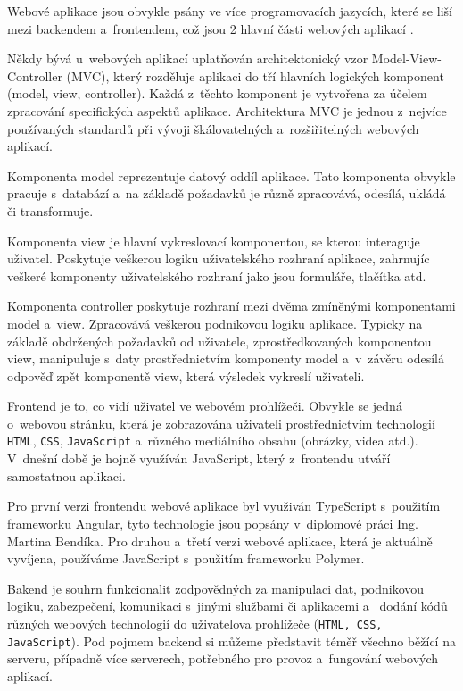 \documentclass[12pt]{article}
\begin{document}
{Webové aplikace jsou obvykle psány ve více programovacích jazycích,
které se liší mezi backendem a~frontendem,
což jsou 2 hlavní části webových aplikací \cite{odinuv}.



Někdy bývá u~webových aplikací uplatňován architektonický vzor Model-View-Controller 
(MVC),
který rozděluje aplikaci do tří hlavních logických komponent (model, view, controller).
Každá z~těchto komponent je vytvořena za účelem zpracování specifických aspektů aplikace.
Architektura MVC je jednou z~nejvíce používaných standardů při vývoji
škálovatelných a~rozšiřitelných webových aplikací.

Komponenta model reprezentuje datový oddíl aplikace. 
Tato komponenta obvykle pracuje s~databází a~na základě požadavků 
je různě zpracovává, odesílá, ukládá či transformuje.

Komponenta view je hlavní vykreslovací komponentou, se kterou interaguje uživatel.
Poskytuje veškerou logiku uživatelského rozhraní aplikace, 
zahrnujíc veškeré komponenty uživatelského rozhraní jako jsou formuláře, tlačítka 
atd.

Komponenta controller poskytuje rozhraní mezi dvěma zmíněnými komponentami
model a~view. Zpracovává veškerou podnikovou logiku aplikace. 
Typicky na základě obdržených požadavků od uživatele, zprostředkovaných komponentou
view, manipuluje s~daty prostřednictvím komponenty model a~v~závěru odesílá
odpověď zpět komponentě view, která výsledek vykreslí uživateli.



Frontend je to, co vidí uživatel ve webovém prohlížeči.
Obvykle se jedná o~webovou stránku, která je zobrazována uživateli prostřednictvím
technologií \texttt{HTML}, \texttt{CSS}, \texttt{JavaScript} a~různého mediálního obsahu (obrázky, videa atd.).
V~dnešní době je hojně využíván JavaScript, který z~frontendu utváří samostatnou aplikaci.

Pro první verzi frontendu webové aplikace byl využiván TypeScript
s~použitím frameworku Angular,
tyto technologie jsou popsány v~diplomové práci Ing. Martina Bendíka.
Pro druhou a~třetí verzi webové aplikace, která je aktuálně vyvíjena, 
používáme JavaScript s~použitím frameworku Polymer.


Bakend je souhrn funkcionalit zodpovědných za manipulaci dat, 
podnikovou logiku, zabezpečení, komunikaci s~jinými službami či aplikacemi a~
dodání kódů různých webových technologií do uživatelova prohlížeče (\texttt{HTML, CSS, JavaScript}).
Pod pojmem backend si můžeme představit téměř všechno běžící na serveru, 
případně více serverech, potřebného pro provoz a~fungování webových aplikací.

}
\end{document}
